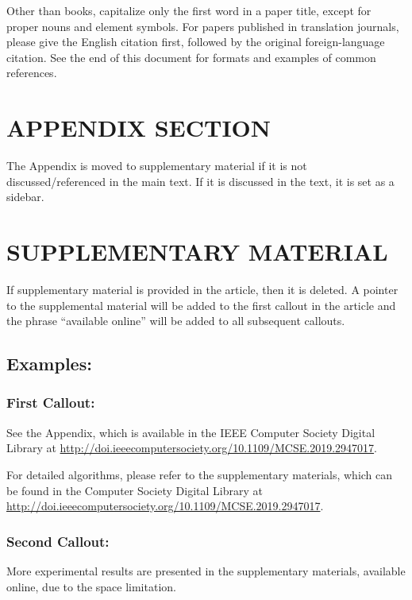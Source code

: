 \documentclass{IEEEcsmag}
\begin{document}
Other than books, capitalize only the first word in a paper title, except for proper nouns and element symbols. For papers published in translation journals, please give the English citation first, followed by the original foreign-language citation. See the end of this document for formats and examples of common references.\vspace*{4pt}

\section{APPENDIX SECTION}

 The Appendix is moved to supplementary material if it is not discussed/referenced in the main text. If it is discussed in the text, it is set as a sidebar.  


\section{SUPPLEMENTARY MATERIAL}

If supplementary material is provided in the article, then it is deleted. A pointer to the supplemental material will be added to the first callout in the article and the phrase “available online” will be added to all subsequent callouts.

\subsection{Examples:}
\subsubsection{First Callout:} 

See the Appendix, which is available in the IEEE Computer Society Digital Library at \url{http://doi.ieeecomputersociety.org/10.1109/MCSE.2019.2947017}.

For detailed algorithms, please refer to the supplementary materials, which can be found in the Computer Society Digital Library at \url{http://doi.ieeecomputersociety.org/10.1109/MCSE.2019.2947017}.\vspace*{-8pt}

\subsubsection{Second Callout:}

More experimental results are presented in the supplementary materials, available online, due to the space limitation.\vspace*{-8pt}
\end{document}
